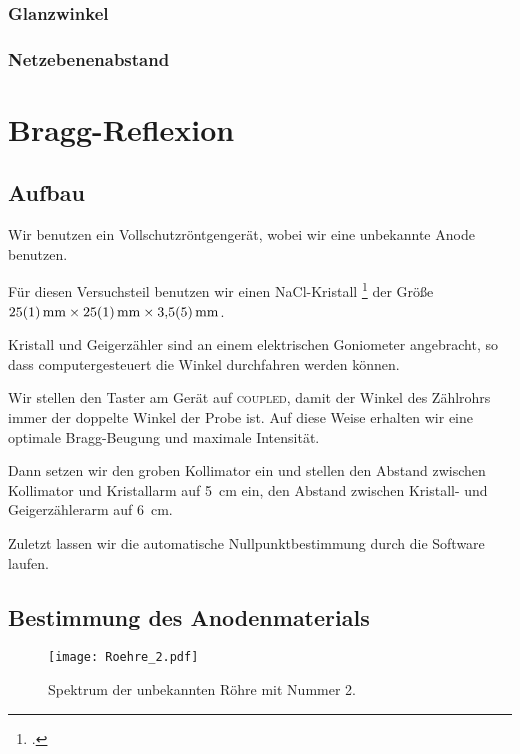 \subsection{Glanzwinkel}

\subsection{Netzebenenabstand}

\chapter{Bragg-Reflexion}

\section{Aufbau}

Wir benutzen ein Vollschutzröntgengerät, wobei wir eine unbekannte Anode
benutzen. \parencite{leybold/554800}

Für diesen Versuchsteil benutzen wir einen NaCl-Kristall
\footcite{wikipedia/hygroskopie} der Größe $\SI{25 +- 1}{\milli\meter}
\times \SI{25 +- 1}{\milli\meter} \times \SI{3.5 +- 0.5}{\milli\meter}$.

Kristall und Geigerzähler sind an einem elektrischen Goniometer angebracht, so
dass computergesteuert die Winkel durchfahren werden können.
\parencite{leybold/554831} \parencite{wikipedia/Goniometer}

Wir stellen den Taster am Gerät auf \textsc{coupled}, damit der Winkel des
Zählrohrs immer der doppelte Winkel der Probe ist. \parencite{leybold/554800}
Auf diese Weise erhalten wir eine optimale Bragg-Beugung und maximale
Intensität.

Dann setzen wir den groben Kollimator ein und stellen den Abstand zwischen
Kollimator und Kristallarm auf \SI{5}{\centi\meter} ein, den Abstand zwischen
Kristall- und Geigerzählerarm auf \SI{6}{\centi\meter}.

Zuletzt lassen wir die automatische Nullpunktbestimmung durch die Software
laufen.

\section{Bestimmung des Anodenmaterials}

\begin{figure}[htbp]
    \centering
    \texttt{[image: Roehre\_2.pdf]}
    \caption{%
        Spektrum der unbekannten Röhre mit Nummer 2.
    }
    \label{fig:}
\end{figure}

